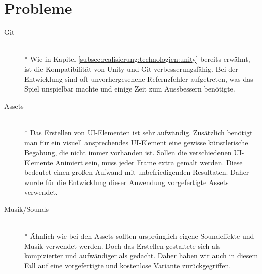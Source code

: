 \section{Probleme}
\label{sec:implementierung:probleme}
\begin{description}
    \item[Git] \hfill \\* Wie in Kapitel \ref{subsec:realisierung:technologien:unity} bereits erwähnt, ist die Kompatibilität von Unity und Git verbesserungsfähig. Bei der Entwicklung sind oft unvorhergesehene Refernzfehler aufgetreten, was das Spiel unspielbar machte und einige Zeit zum Aussbessern benötigte.
    \item[Assets] \hfill \\* Das Erstellen von UI-Elementen ist sehr aufwändig. Zusätzlich benötigt man für ein visuell ansprechendes UI-Element eine gewisse künstlerische Begabung, die nicht immer vorhanden ist. Sollen die verschiedenen UI-Elemente Animiert sein, muss jeder Frame extra gemalt werden. Diese bedeutet einen großen Aufwand mit unbefriedigenden Resultaten. Daher wurde für die Entwicklung dieser Anwendung vorgefertigte Assets verwendet.
    \item[Musik/Sounds] \hfill \\* Ähnlich wie bei den Assets sollten ursprünglich eigene Soundeffekte und Musik verwendet werden. Doch das Erstellen gestaltete sich als kompizierter und aufwändiger als gedacht. Daher haben wir auch in diesem Fall auf eine vorgefertigte und kostenlose Variante zurückgegriffen.
\end{description}





























